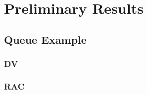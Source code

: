 
%

\chapter{Preliminary Results}
\label{cha:preliminary_results}

\section{Queue Example}
\label{sec:queue_example}

\subsection{DV}
\label{sub:dv}

\subsection{RAC}
\label{sub:rac_pr}